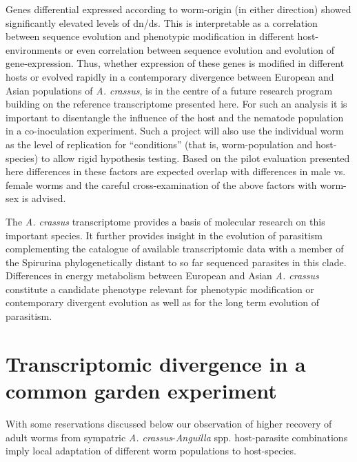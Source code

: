 Genes differential expressed according to worm-origin (in either
direction) showed significantly elevated levels of dn/ds. This is
interpretable as a correlation between sequence evolution and
phenotypic modification in different host-environments or even
correlation between sequence evolution and evolution of
gene-expression. Thus, whether expression of these genes is modified
in different hosts or evolved rapidly in a contemporary divergence
between European and Asian populations of \textit{A. crassus}, is in
the centre of a future research program building on the reference
transcriptome presented here. For such an analysis it is important to
disentangle the influence of the host and the nematode population in a
co-inoculation experiment. Such a project will also use the individual
worm as the level of replication for ``conditions'' (that is,
worm-population and host-species) to allow rigid hypothesis
testing. Based on the pilot evaluation presented here differences in
these factors are expected overlap with differences in male vs. female
worms and the careful cross-examination of the above factors with
worm-sex is advised.

The \textit{A. crassus} transcriptome provides a basis of molecular
research on this important species. It further provides insight in the
evolution of parasitism complementing the catalogue of available
transcriptomic data with a member of the Spirurina phylogenetically
distant to so far sequenced parasites in this clade. Differences in
energy metabolism between European and Asian \textit{A. crassus}
constitute a candidate phenotype relevant for phenotypic modification
or contemporary divergent evolution as well as for the long term
evolution of parasitism.


\section{Transcriptomic divergence in a common garden experiment}
\label{sec:exp-inf}

With some reservations discussed below our observation of higher
recovery of adult worms from sympatric
\textit{A. crassus}-\textit{Anguilla} spp. host-parasite combinations
imply local adaptation of different worm populations to host-species.

